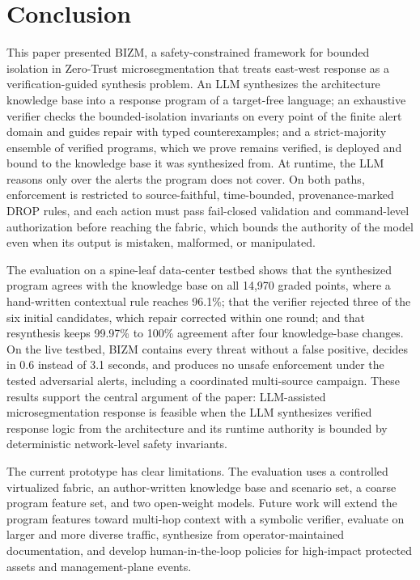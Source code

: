\documentclass[final,5p]{elsarticle}
\begin{document}
\section{Conclusion}
\label{sec:conclusion}

This paper presented BIZM, a safety-constrained framework for bounded isolation in Zero-Trust microsegmentation that treats east-west response as a verification-guided synthesis problem. An LLM synthesizes the architecture knowledge base into a response program of a target-free language; an exhaustive verifier checks the bounded-isolation invariants on every point of the finite alert domain and guides repair with typed counterexamples; and a strict-majority ensemble of verified programs, which we prove remains verified, is deployed and bound to the knowledge base it was synthesized from. At runtime, the LLM reasons only over the alerts the program does not cover. On both paths, enforcement is restricted to source-faithful, time-bounded, provenance-marked DROP rules, and each action must pass fail-closed validation and command-level authorization before reaching the fabric, which bounds the authority of the model even when its output is mistaken, malformed, or manipulated.

The evaluation on a spine-leaf data-center testbed shows that the synthesized program agrees with the knowledge base on all 14,970 graded points, where a hand-written contextual rule reaches 96.1\%; that the verifier rejected three of the six initial candidates, which repair corrected within one round; and that resynthesis keeps 99.97\% to 100\% agreement after four knowledge-base changes. On the live testbed, BIZM contains every threat without a false positive, decides in 0.6 instead of 3.1 seconds, and produces no unsafe enforcement under the tested adversarial alerts, including a coordinated multi-source campaign. These results support the central argument of the paper: LLM-assisted microsegmentation response is feasible when the LLM synthesizes verified response logic from the architecture and its runtime authority is bounded by deterministic network-level safety invariants.

The current prototype has clear limitations. The evaluation uses a controlled virtualized fabric, an author-written knowledge base and scenario set, a coarse program feature set, and two open-weight models. Future work will extend the program features toward multi-hop context with a symbolic verifier, evaluate on larger and more diverse traffic, synthesize from operator-maintained documentation, and develop human-in-the-loop policies for high-impact protected assets and management-plane events.
\end{document}
